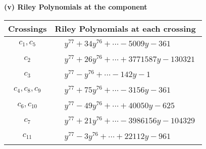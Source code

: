 \documentclass[1p]{elsarticle_modified}
\theoremstyle{definition}
\begin{document}
\flushleft \textbf{(v) Riley Polynomials at the component}\newline \\
\begin{tabular}{m{50pt}|m{274pt}}
Crossings & \hspace{64pt}Riley Polynomials at each crossing \\
\hline $$\begin{aligned}c_{1},c_{5}\end{aligned}$$&$\begin{aligned}
&y^{77}+34 y^{76}+\cdots-5009 y-361
\end{aligned}$\\
\hline $$\begin{aligned}c_{2}\end{aligned}$$&$\begin{aligned}
&y^{77}+26 y^{76}+\cdots+3771587 y-130321
\end{aligned}$\\
\hline $$\begin{aligned}c_{3}\end{aligned}$$&$\begin{aligned}
&y^{77}- y^{76}+\cdots-142 y-1
\end{aligned}$\\
\hline $$\begin{aligned}c_{4},c_{8},c_{9}\end{aligned}$$&$\begin{aligned}
&y^{77}+75 y^{76}+\cdots-3156 y-361
\end{aligned}$\\
\hline $$\begin{aligned}c_{6},c_{10}\end{aligned}$$&$\begin{aligned}
&y^{77}-49 y^{76}+\cdots+40050 y-625
\end{aligned}$\\
\hline $$\begin{aligned}c_{7}\end{aligned}$$&$\begin{aligned}
&y^{77}+21 y^{76}+\cdots-3986156 y-104329
\end{aligned}$\\
\hline $$\begin{aligned}c_{11}\end{aligned}$$&$\begin{aligned}
&y^{77}-3 y^{76}+\cdots+22112 y-961
\end{aligned}$\\
\hline
\end{tabular}\\~\\
\end{document}
